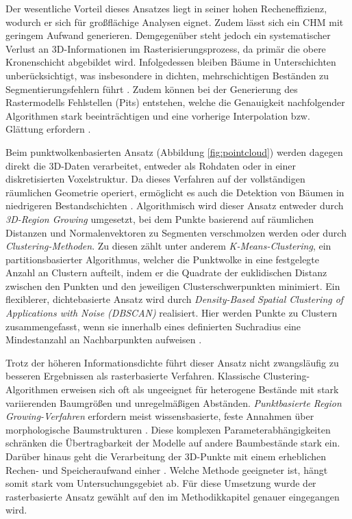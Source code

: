 Der wesentliche Vorteil dieses Ansatzes liegt in seiner hohen Recheneffizienz, wodurch er sich für großflächige Analysen eignet. Zudem lässt sich ein CHM mit geringem Aufwand generieren. Demgegenüber steht jedoch ein systematischer Verlust an 3D-Informationen im Rasterisierungsprozess, da primär die obere Kronenschicht abgebildet wird. Infolgedessen bleiben Bäume in Unterschichten unberücksichtigt, was insbesondere in dichten, mehrschichtigen Beständen zu Segmentierungsfehlern führt \cite{munzingerMappingUrbanForest2022}. Zudem können bei der Generierung des Rastermodells Fehlstellen (Pits) entstehen, welche die Genauigkeit nachfolgender Algorithmen stark beeinträchtigen und eine vorherige Interpolation bzw. Glättung erfordern \cite{liIndividualTreeSegmentation2023}.

Beim punktwolkenbasierten Ansatz (Abbildung \ref{fig:pointcloud}) werden dagegen direkt die 3D-Daten verarbeitet, entweder als Rohdaten oder in einer diskretisierten Voxelstruktur. Da dieses Verfahren auf der vollständigen räumlichen Geometrie operiert, ermöglicht es auch die Detektion von Bäumen in niedrigeren Bestandschichten \cite{munzingerMappingUrbanForest2022}. Algorithmisch wird dieser Ansatz entweder durch \textit{3D-Region Growing} umgesetzt, bei dem Punkte basierend auf räumlichen Distanzen und Normalenvektoren zu Segmenten verschmolzen werden oder durch \textit{Clustering-Methoden}. Zu diesen zählt unter anderem \textit{K-Means-Clustering}, ein partitionsbasierter Algorithmus, welcher die Punktwolke in eine festgelegte Anzahl an Clustern aufteilt, indem er die Quadrate der euklidischen Distanz zwischen den Punkten und den jeweiligen Clusterschwerpunkten minimiert. Ein flexiblerer, dichtebasierte Ansatz wird durch \textit{Density-Based Spatial Clustering of Applications with Noise (\ac{DBSCAN})} realisiert. Hier werden Punkte zu Clustern zusammengefasst, wenn sie innerhalb eines definierten Suchradius eine Mindestanzahl an Nachbarpunkten aufweisen \cite{fuIndividualTreeSegmentationUAV2024}.

Trotz der höheren Informationsdichte führt dieser Ansatz nicht zwangsläufig zu besseren Ergebnissen als rasterbasierte Verfahren. Klassische Clustering-Algorithmen erweisen sich oft als ungeeignet für heterogene Bestände mit stark variierenden Baumgrößen und unregelmäßigen Abständen. \textit{Punktbasierte Region Growing-Verfahren} erfordern meist wissensbasierte, feste Annahmen über morphologische Baumstrukturen \cite{fuIndividualTreeSegmentationUAV2024}. Diese komplexen Parameterabhängigkeiten schränken die Übertragbarkeit der Modelle auf andere Baumbestände stark ein. Darüber hinaus geht die Verarbeitung der 3D-Punkte mit einem erheblichen Rechen- und Speicheraufwand einher \cite{liIndividualTreeSegmentation2023}. Welche Methode geeigneter ist, hängt somit stark vom Untersuchungsgebiet ab. Für diese Umsetzung wurde der rasterbasierte Ansatz gewählt auf den im Methodikkapitel genauer eingegangen wird.
 
